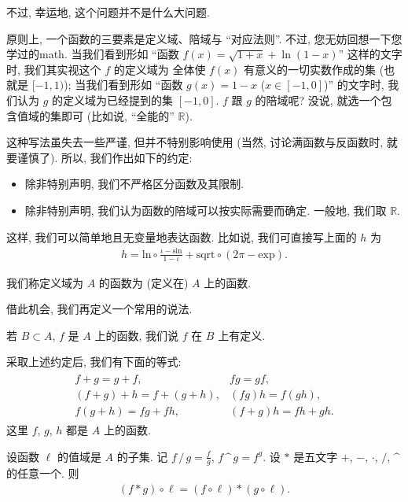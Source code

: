 不过, 幸运地, 这个问题并不是什么大问题.

原则上, 一个函数的三要素是定义域、陪域与 ``对应法则''.
不过, 您无妨回想一下您学过的\gls{math}.
当我们看到形如
``函数 $f(x) = \sqrt{1 + x} + \operatorname{ln} {(1 - x)}$''
这样的文字时,
我们其实视这个 $f$ 的定义域为%
全体使 $f(x)$ 有意义的一切实数作成的集
(也就是 $[-1, 1)$);
当我们看到形如
``函数 $g(x) = 1 - x$ ($x \in [-1, 0]$)'' 的文字时,
我们认为 $g$ 的定义域为已经提到的集 $[-1, 0]$.
$f$ 跟 $g$ 的陪域呢?
没说, 就选一个包含值域的集即可
(比如说, ``全能的'' $\mathbb{R}$).

这种写法虽失去一些严谨, 但并不特别影响使用
(当然, 讨论满函数与反函数时, 就要谨慎了).
所以, 我们作出如下的约定:
\begin{itemize}
    \item 除非特别声明, 我们不严格区分函数及其限制.
    \item 除非特别声明, 我们认为函数的陪域可以按实际需要而确定.
          一般地, 我们取 $\mathbb{R}$.
\end{itemize}
这样, 我们可以简单地且无变量地表达函数.
比如说, 我们可直接写上面的 $h$ 为
\begin{align*}
    h = {\mathrm{ln}} \circ \frac{\iota - \mathrm{sin}}{1 - \iota}
    + \mathrm{sqrt} \circ (2\pi - \mathrm{exp}).
\end{align*}

\begin{definition}
    我们称定义域为 $A$ 的函数为 (定义在) $A$ 上的函数.
\end{definition}

借此机会, 我们再定义一个常用的说法.

\begin{definition}
    若 $B \subset A$, $f$ 是 $A$ 上的函数,
    我们说 $f$ 在 $B$ 上有定义.
\end{definition}

采取上述约定后, 我们有下面的等式:
\begin{align*}
    \begin{array}{ll}
        f + g = g + f,             & fg = gf,            \\
        (f + g) + h = f + (g + h), & (fg)h = f(gh),      \\
        f(g + h) = fg + fh,        & (f + g)h = fh + gh.
    \end{array}
\end{align*}
这里 $f$, $g$, $h$ 都是 $A$ 上的函数.

设函数 $\ell$ 的值域是 $A$ 的子集.
记 $f \, / \, g = \frac{f}{g}$,
$f \, \text{\textasciicircum} \, g = f^g$.
设 $\ast$ 是五文字
$+$, $-$, $\cdot$, $/$, $\text{\textasciicircum}$
的任意一个.
则
\begin{align*}
    (f \ast g) \circ \ell = (f \circ \ell) \ast (g \circ \ell).
\end{align*}

